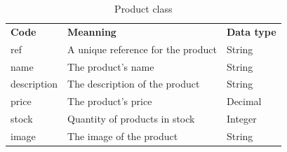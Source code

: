 \documentclass[12pt,a4paper]{report}
\begin{document}
	\begin{table}[H]
		\begin{center}
			\captionsetup[table]{skip=10pt}
			\caption{Product class}
			\setlength\doublerulesep{0.5pt}
			
			\begin{tabular}{|  p{5cm}|  p{6cm}|  p{4cm}|}
				\rowcolor{LightCyan}
				
				\hline
				\multicolumn{3}{c}{Product class}\\
				\hline 
				\textbf{Code} & \textbf{Meanning} & \textbf{Data type} 
				\\ \hline
				
				ref &                        
				A unique reference for the product &                        
				String                     
				
				\\ \hline
				
				name &                        
				The product's name &                        
				String   
				\\ \hline
				
				description &                        
				The description of the product &                        
				String 
				\\ \hline
				
				price &                        
				The product's price &                        
				Decimal   
				\\ \hline
				
				stock &                        
				Quantity of products in stock &                        
				Integer  
				\\ \hline
				
				image &                        
				The image of the product &                        
				String
				
				\\ \hline
				
			\end{tabular}
			
		\end{center}
	\end{table}
\end{document}
